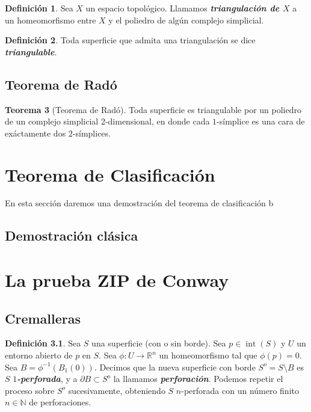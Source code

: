 \documentclass[10pt]{report}
\newcommand{\R}{\mathbb{R}}
\newcommand{\N}{\mathbb{N}}
\DeclareMathOperator{\interior}{int} %
\newcommand{\enfatiza}[1]{\textbf{\textit{#1}}}
\theoremstyle{definition}
\newtheorem{defin}{Definición}[section]
\newtheorem{tma}[defin]{Teorema}
\begin{document}
\begin{defin}%
Sea $X$ un espacio topológico. Llamamos \enfatiza{triangulación de $X$} a un homeomorfismo entre $X$ y el poliedro de algún complejo simplicial.
\end{defin}

\begin{defin}%
Toda superficie que admita una triangulación se dice \enfatiza{triangulable}.
\end{defin}



\section{Teorema de Radó}

\begin{tma}[Teorema de Radó]
Toda superficie es triangulable por un poliedro de un complejo simplicial 2-dimensional, en donde cada $1$-símplice es una cara de exáctamente dos $2$-símplices.\label{teo:rado}
\end{tma}


\chapter{Teorema de Clasificación}
En esta sección daremos una demostración del teorema de clasificación b

\section{Demostración clásica}

\chapter{La prueba ZIP de Conway}

\section{Cremalleras}

\begin{defin}%
\label{def:perforacion}
Sea $S$ una superficie (con o sin borde). Sea $p\in \interior (S)$ y $U$ un entorno abierto de $p$ en $S$. Sea $\phi :U\to \R^n$ un homeomorfismo tal que $\phi (p)=0$. Sea $B=\phi ^{-1}(B_1(0))$. Decimos que la nueva superficie con borde $S^o=S\setminus B$ es $S$ \enfatiza{$1$-perforada}, y a $\partial B\subset S^o$ la llamamos \enfatiza{perforación}. Podemos repetir el proceso sobre $S^o$ sucesivamente, obteniendo $S$ $n$-perforada con un número finito $n\in \N$ de perforaciones.
\end{defin}
\end{document}
